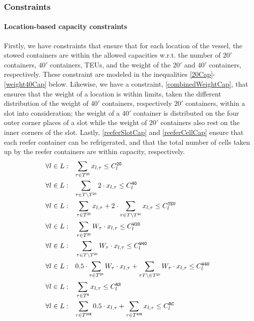 \subsubsection*{Constraints}
\paragraph{Location-based capacity constraints}
Firstly, we have constraints that ensure that for each location of the vessel, the stowed containers are within the allowed capacities w.r.t. the number of $20'$ containers, $40'$ containers, TEUs, and the weight of the $20'$ and $40'$ containers, respectively. These constraint are modeled in the inequalities \eqref{20Cap}-\eqref{weight40Cap} below.
{Likewise, we have a constraint, \eqref{combinedWeightCap}, that ensures that the weight of a location is within limits, taken the different distribution of the weight of $40'$ containers, respectively $20'$ containers, within a slot into consideration; the weight of a $40'$ container is distributed on the four outer corner places of a slot while the weight of $20'$ containers also rest on the inner corners of the slot.}
Lastly, \eqref{reeferSlotCap} and \eqref{reeferCellCap} ensure that each reefer container can be refrigerated, and that {the total number of cells taken up by the reefer containers are within capacity}, respectively. 
\begin{align}
{\forall l \in L:}&\quad
	\label{20Cap}
	{\sum_{\tau \in T^{\texttt{20}}} x_{l,\tau} \leq C_l^{\texttt{20}} }\\
	\label{40Cap}    	
	{\forall l \in L:}&\quad
	{\sum_{\tau \in T\setminus T^{\texttt{20}}} 2\cdot x_{l,\tau} \leq C_l^{\texttt{40}} }\\
	\label{teuCap}
	\forall l \in L:&\quad
	\sum_{\tau \in T^{\texttt{20}}} x_{l,\tau} + 2\cdot\sum_{\tau \in T\setminus T^{\texttt{20}}} x_{l,\tau} \leq C_l^{\texttt{TEU}}\\
	\label{weight20Cap}
	\forall l \in L:&\quad
	\sum_{\tau \in T^{\texttt{20}}} W_\tau\cdot x_{l,\tau} \leq C_l^{\texttt{W20}}\\
	\label{weight40Cap}
	\forall l \in L:&\quad\sum_{\tau \in T\setminus T^{\texttt{20}}} W_\tau\cdot x_{l,\tau} \leq C_l^{\texttt{W40}} \\
	\label{combinedWeightCap}
	\forall l \in L:&\quad 0.5\cdot \sum_{\tau \in T^{\texttt{20}}} W_\tau\cdot x_{l,\tau} + \sum_{\tau T\setminus \in T^{\texttt{20}}		} W_\tau\cdot x_{l,\tau} \leq C_l^{\texttt{W40}}\\
	\label{reeferSlotCap}
	\forall l \in L:&\quad\sum_{\tau \in T^{\texttt{R}}} x_{l,\tau} \leq C_l^{\texttt{RS}} \\
	\label{reeferCellCap}
	{\forall l \in L:}&\quad
	{\sum_{\tau \in T^{\texttt{20R}}} 0.5\cdot x_{l,\tau} + \sum_{\tau \in T^{\texttt{40R}}} x_{l,\tau} \leq C_l^{\texttt{RC}} }
\end{align}	 
%

